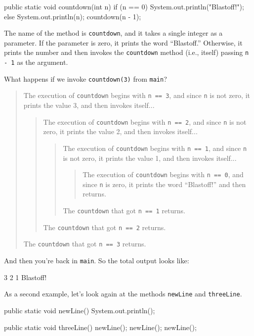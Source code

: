 \documentclass[12pt]{book}
\theoremstyle{exercise}
\newcommand{\java}[1]{\lstinline{#1}} %
\begin{document}
\begin{code}
    public static void countdown(int n) {
        if (n == 0) {
            System.out.println("Blastoff!");
        } else {
            System.out.println(n);
            countdown(n - 1);
        }
    }
\end{code}

The name of the method is \java{countdown}, and it takes a single integer as a parameter.
If the parameter is zero, it prints the word ``Blastoff.''
Otherwise, it prints the number and then invokes the \java{countdown} method (i.e., itself) passing \java{n - 1} as the argument.

What happens if we invoke \java{countdown(3)} from \java{main}?

\vspace{-1ex}
\begin{quote}
The execution of \java{countdown} begins with \java{n == 3}, and since \java{n} is not zero, it prints the value 3, and then invokes itself...
\begin{quote}
The execution of \java{countdown} begins with \java{n == 2}, and since \java{n} is not zero, it prints the value 2, and then invokes itself...
\begin{quote}
The execution of \java{countdown} begins with \java{n == 1}, and since \java{n} is not zero, it prints the value 1, and then invokes itself...
\begin{quote}
The execution of \java{countdown} begins with \java{n == 0}, and since \java{n} is zero, it prints the word ``Blastoff!'' and then returns.
\end{quote}
The \java{countdown} that got \java{n == 1} returns.
\end{quote}
The \java{countdown} that got \java{n == 2} returns.
\end{quote}
The \java{countdown} that got \java{n == 3} returns.
\end{quote}
\vspace{-1ex}

And then you're back in \java{main}.
So the total output looks like:

\begin{stdout}
3
2
1
Blastoff!
\end{stdout}

As a second example, let's look again at the methods \java{newLine} and \java{threeLine}.

\begin{code}
    public static void newLine() {
        System.out.println();
    }

    public static void threeLine() {
        newLine();
        newLine();
        newLine();
    }
\end{code}
\end{document}
